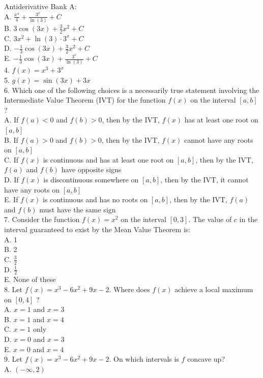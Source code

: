 Antiderivative Bank A:\\
A. $\frac{x^{4}}{4}+\frac{3^{x}}{\ln (3)}+C$\\
B. $3 \cos (3 x)+\frac{3}{2} x^{2}+C$\\
C. $3 x^{2}+\ln (3) \cdot 3^{x}+C$\\
D. $-\frac{1}{3} \cos (3 x)+\frac{3}{2} x^{2}+C$\\
E. $-\frac{1}{3} \cos (3 x)+\frac{3^{x}}{\ln (3)}+C$\\
4. $f(x)=x^{3}+3^{x}$\\
5. $g(x)=\sin (3 x)+3 x$\\
6. Which one of the following choices is a necessarily true statement involving the Intermediate Value Theorem (IVT) for the function $f(x)$ on the interval $[a, b]$ ?\\
A. If $f(a)<0$ and $f(b)>0$, then by the IVT, $f(x)$ has at least one root on $[a, b]$\\
B. If $f(a)>0$ and $f(b)>0$, then by the IVT, $f(x)$ cannot have any roots on $[a, b]$\\
C. If $f(x)$ is continuous and has at least one root on $[a, b]$, then by the IVT, $f(a)$ and $f(b)$ have opposite signs\\
D. If $f(x)$ is discontinuous somewhere on $[a, b]$, then by the IVT, it cannot have any roots on $[a, b]$\\
E. If $f(x)$ is continuous and has no roots on $[a, b]$, then by the IVT, $f(a)$ and $f(b)$ must have the same sign\\
7. Consider the function $f(x)=x^{2}$ on the interval $[0,3]$. The value of $c$ in the interval guaranteed to exist by the Mean Value Theorem is:\\
A. 1\\
B. 2\\
C. $\frac{3}{2}$\\
D. $\frac{1}{2}$\\
E. None of these\\
8. Let $f(x)=x^{3}-6 x^{2}+9 x-2$. Where does $f(x)$ achieve a local maximum on $[0,4]$ ?\\
A. $x=1$ and $x=3$\\
B. $x=1$ and $x=4$\\
C. $x=1$ only\\
D. $x=0$ and $x=3$\\
E. $x=0$ and $x=4$\\
9. Let $f(x)=x^{3}-6 x^{2}+9 x-2$. On which intervals is $f$ concave up?\\
A. $(-\infty, 2)$\\
